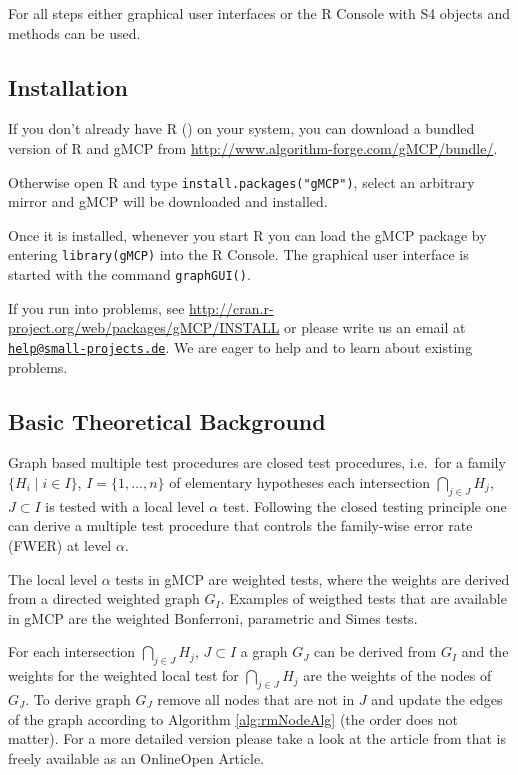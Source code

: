 \documentclass[a4paper, 10pt]{article}\usepackage[]{graphicx}\usepackage[]{color}
\numberwithin{equation}{section}
\theoremstyle{definition}
\theoremstyle{plain}
\begin{document}
For all steps either graphical user interfaces or the R Console with S4
objects and methods can be used.


\subsection{Installation}

If you don't already have R (\cite{R}) on your system, you can download a bundled
version of R and gMCP from \url{http://www.algorithm-forge.com/gMCP/bundle/}.

Otherwise open R and type \texttt{install.packages("gMCP")}, 
select an arbitrary mirror and gMCP will be downloaded and installed.

Once it is installed, whenever you start R you can load the gMCP
package by entering \texttt{library(gMCP)} into the R Console. The
graphical user interface is started with the command
\texttt{graphGUI()}.

If you run into problems, see
\url{http://cran.r-project.org/web/packages/gMCP/INSTALL} or please write us
an email at
\href{mailto:help@small-projects.de}{\texttt{help@small-projects.de}}.
We are eager to help and to learn about existing problems. 

\subsection{Basic Theoretical Background}

Graph based multiple test procedures are closed test procedures, i.e.\ for a
family $\{H_i\;|\; i\in I\}$, $I=\{1,\ldots,n\}$ of elementary hypotheses each
intersection $\bigcap_{j\in J}H_j$, $J\subset I$ is tested with a local level
$\alpha$ test. Following the closed testing principle one can derive a
multiple test procedure that controls the family-wise error rate (FWER) at
level $\alpha$.

The local level $\alpha$ tests in gMCP are weighted tests, where the weights are
derived from a directed weighted graph $G_I$. Examples of weigthed tests that are
available in gMCP are the weighted Bonferroni, parametric and Simes tests.

For each intersection $\bigcap_{j\in J}H_j$, $J\subset I$ a graph $G_J$ can be
derived from $G_I$ and the weights for the weighted local test for
$\bigcap_{j\in J}H_j$ are the weights of the nodes of $G_J$. To derive
graph $G_J$ remove all nodes that are not in $J$ and update the edges
of the graph according to Algorithm \ref{alg:rmNodeAlg} (the order does not matter).
For a more detailed version please take a look at the article from \cite{Bretz11} 
that is freely available as an OnlineOpen Article.
\end{document}
